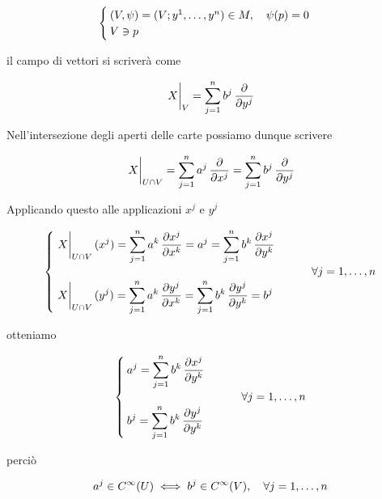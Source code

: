 \begin{equation}
	\begin{cases}
		(V,\psi) = (V; y^{1},\dots,y^{n}) \in M \qcomma \psi(p) = 0 \\
		V \ni p
	\end{cases}
\end{equation}

il campo di vettori si scriverà come

\begin{equation}
	\eval{X}_{V} = \sum_{j=1}^{n} b^{j} \, \pdv{y^{j}}
\end{equation}

Nell'intersezione degli aperti delle carte possiamo dunque scrivere

\begin{equation}
	\eval{X}_{U \cap V} = \sum_{j=1}^{n} a^{j} \, \pdv{x^{j}} = \sum_{j=1}^{n} b^{j} \, \pdv{y^{j}}
\end{equation}

Applicando questo alle applicazioni $ x^{j} $ e $ y^{j} $

\begin{equation}
	\begin{cases}
		\displaystyle \eval{X}_{U \cap V} (x^{j}) = \sum_{j=1}^{n} a^{k} \, \pdv{x^{j}}{x^{k}} = a^{j} = \sum_{j=1}^{n} b^{k} \, \pdv{x^{j}}{y^{k}} \\\\
		\displaystyle \eval{X}_{U \cap V} (y^{j}) = \sum_{j=1}^{n} a^{k} \, \pdv{y^{j}}{x^{k}} = \sum_{j=1}^{n} b^{k} \, \pdv{y^{j}}{y^{k}} = b^{j}
	\end{cases} %
	\qquad \forall j=1,\dots,n
\end{equation}

otteniamo

\begin{equation}
	\begin{cases}
		\displaystyle a^{j} = \sum_{j=1}^{n} b^{k} \, \pdv{x^{j}}{y^{k}} \\\\
		\displaystyle b^{j} = \sum_{j=1}^{n} b^{k} \, \pdv{y^{j}}{y^{k}}
	\end{cases} %
	\qquad \forall j=1,\dots,n
\end{equation}

perciò

\begin{equation}
	a^{j} \in C^{\infty}(U) \iff b^{j} \in C^{\infty}(V) \qcomma \forall j=1,\dots,n
\end{equation}

